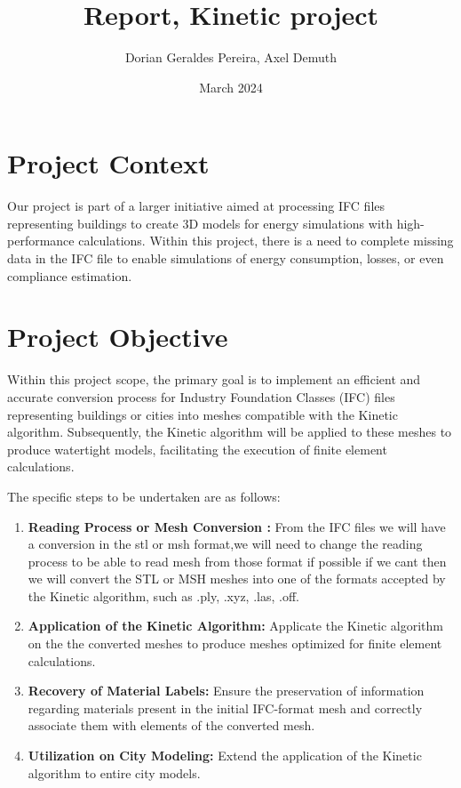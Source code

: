 \documentclass{article}
\title{Report, Kinetic project}
\author{Dorian Geraldes Pereira, Axel Demuth}
\date{March 2024}
\begin{document}
\maketitle
\tableofcontents
\newpage
\section{Project Context}

Our project is part of a larger initiative aimed at processing 
IFC files representing buildings to create 3D models for energy 
simulations with high-performance calculations. Within this project, there is a need to 
complete missing data in the IFC file to enable simulations 
of energy consumption, losses, or even compliance estimation.

\section{Project Objective}

Within this project scope, the primary goal is to implement an efficient and accurate 
conversion process for Industry Foundation Classes (IFC) 
files representing buildings or cities into meshes compatible with the 
Kinetic algorithm. Subsequently, the Kinetic algorithm will be applied to these 
meshes to produce watertight models, facilitating the execution of finite element calculations.

The specific steps to be undertaken are as follows:

\begin{enumerate}   
    \item \textbf{Reading Process or Mesh Conversion :} From the IFC files we will have a 
    conversion in the stl or msh format,we will need to change the reading process to be able 
    to read mesh from those format if possible if we cant then we will convert the STL 
    or MSH meshes into one of the formats accepted by the Kinetic algorithm, 
    such as .ply, .xyz, .las, .off.
    
    \item \textbf{Application of the Kinetic Algorithm:} Applicate  
    the Kinetic algorithm on the the converted 
    meshes to produce meshes optimized for finite element calculations.
    
    \item \textbf{Recovery of Material Labels:} Ensure the preservation 
    of information regarding materials present in the initial IFC-format mesh 
    and correctly associate them with elements of the converted mesh.
    
    \item \textbf{Utilization on City Modeling:} Extend the application of 
    the Kinetic algorithm to entire city models.
\end{enumerate}
\end{document}

